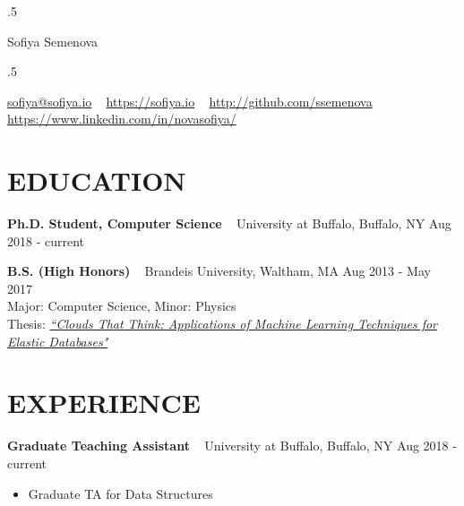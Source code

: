 \documentclass{res}
\begin{document}
 \moveleft.5\hoffset\centerline{\namefont Sofiya Semenova}
 \smallskip
 \moveleft.5\hoffset\centerline{\href{mailto:sofiya@sofiya.io}{sofiya@sofiya.io} ~ \href{https://sofiya.io}{https://sofiya.io} ~ \href{http://github.com/ssemenova}{http://github.com/ssemenova} ~ \href{https://www.linkedin.com/in/novasofiya/}{https://www.linkedin.com/in/novasofiya/}}


\vspace{-3mm}

\begin{resume}


\section{EDUCATION}

\textbf{Ph.D. Student, Computer Science} ~ University at Buffalo, Buffalo, NY \hfill Aug 2018 - current

\textbf{B.S. (High Honors)} ~ Brandeis University, Waltham, MA \hfill Aug 2013 - May 2017 \\
	Major: Computer Science, Minor: Physics \\
	Thesis: \href{https://sofiya.io/media/thesis.pdf}{\sl “Clouds That Think: Applications of Machine Learning Techniques for Elastic Databases"}

\section{EXPERIENCE}

\textbf{Graduate Teaching Assistant} ~ University at Buffalo, Buffalo, NY \hfill Aug 2018 - current \\ 
	\begin{itemize}  \itemsep -2pt %
	\item Graduate TA for Data Structures
	\end{itemize}


\end{resume}
\end{document}
